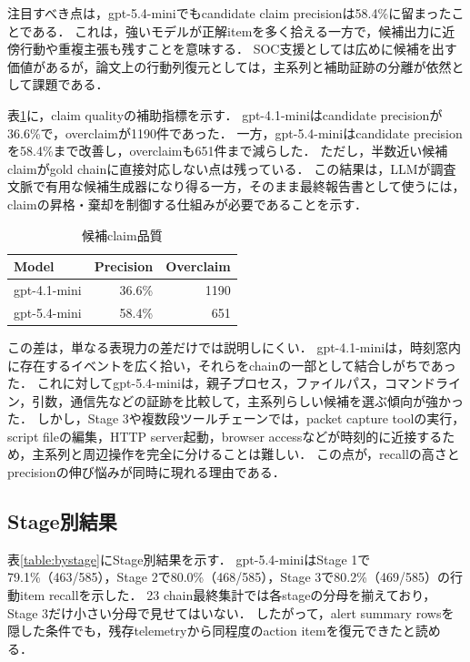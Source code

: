 \documentclass[dvipdfmx]{FITpaper}
\newcommand{\model}[1]{\mbox{\textrm{#1}}}
\begin{document}
注目すべき点は，\model{gpt-5.4-mini}でもcandidate claim precisionは58.4\%に留まったことである．
これは，強いモデルが正解itemを多く拾える一方で，候補出力に近傍行動や重複主張も残すことを意味する．
SOC支援としては広めに候補を出す価値があるが，論文上の行動列復元としては，主系列と補助証跡の分離が依然として課題である．

表\ref{table:claimquality}に，claim qualityの補助指標を示す．
\model{gpt-4.1-mini}はcandidate precisionが36.6\%で，overclaimが1190件であった．
一方，\model{gpt-5.4-mini}はcandidate precisionを58.4\%まで改善し，overclaimも651件まで減らした．
ただし，半数近い候補claimがgold chainに直接対応しない点は残っている．
この結果は，LLMが調査文脈で有用な候補生成器になり得る一方，そのまま最終報告書として使うには，claimの昇格・棄却を制御する仕組みが必要であることを示す．

\begin{table}[ht]
    \centering
    \caption{候補claim品質}
    \label{table:claimquality}
    \begin{tabular}{lrr}
        \toprule
        Model & Precision & Overclaim \\
        \midrule
        \model{gpt-4.1-mini} & 36.6\% & 1190 \\
        \model{gpt-5.4-mini} & 58.4\% & 651 \\
        \bottomrule
    \end{tabular}
\end{table}

この差は，単なる表現力の差だけでは説明しにくい．
\model{gpt-4.1-mini}は，時刻窓内に存在するイベントを広く拾い，それらをchainの一部として結合しがちであった．
これに対して\model{gpt-5.4-mini}は，親子プロセス，ファイルパス，コマンドライン，引数，通信先などの証跡を比較して，主系列らしい候補を選ぶ傾向が強かった．
しかし，Stage 3や複数段ツールチェーンでは，packet capture toolの実行，script fileの編集，HTTP server起動，browser accessなどが時刻的に近接するため，主系列と周辺操作を完全に分けることは難しい．
この点が，recallの高さとprecisionの伸び悩みが同時に現れる理由である．

\subsection{Stage別結果}

表\ref{table:bystage}にStage別結果を示す．
\model{gpt-5.4-mini}はStage 1で79.1\%（463/585），Stage 2で80.0\%（468/585），Stage 3で80.2\%（469/585）の行動item recallを示した．
23 chain最終集計では各stageの分母を揃えており，Stage 3だけ小さい分母で見せてはいない．
したがって，alert summary rowsを隠した条件でも，残存telemetryから同程度のaction itemを復元できたと読める．
\end{document}
